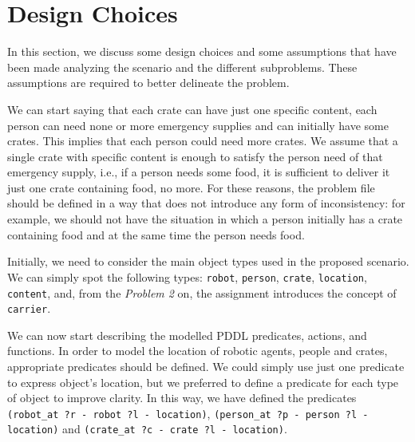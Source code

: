 
\section{Design Choices}
\label{sec3}

In this section, we discuss some design choices and some assumptions that have been made 
analyzing the scenario and the different subproblems. These assumptions are required 
to better delineate the problem.

We can start saying that each crate can have just one specific content, each person can need none or 
more emergency supplies and can initially have some crates. This implies that each person could need 
more crates.
We assume that a single crate with specific content is enough to satisfy the person need of that emergency 
supply, i.e., if a person needs some food, it is sufficient to deliver it just one crate containing food, no more. 
For these reasons, the problem file should be defined in a way that does not introduce any form of inconsistency:
for example, we should not have the situation in which a person initially has a crate containing food and at 
the same time the person needs food.



Initially, we need to consider the main object types used in the proposed scenario.
We can simply spot the following types: \texttt{robot}, \texttt{person}, \texttt{crate}, \texttt{location}, 
\texttt{content}, and, from the \textit{Problem 2} on, the assignment introduces the concept of \texttt{carrier}.

We can now start describing the modelled PDDL predicates, actions, and functions.
In order to model the location of robotic agents, people and crates, appropriate predicates should be defined.
We could simply use just one predicate to express object's location, but we preferred to define a predicate for 
each type of object to improve clarity. In this way, we have defined the predicates 
\texttt{(robot\_at ?r - robot ?l - location)}, \texttt{(person\_at ?p - person ?l - location)} and 
\texttt{(crate\_at ?c - crate ?l - location)}.



